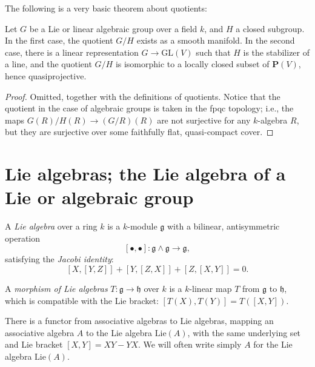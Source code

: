 The following is a very basic theorem about quotients:

\begin{theorem}
 \label{theorem-quotients}
Let $G$ be a Lie or linear algebraic group over a field $k$, and $H$ a closed subgroup. In the first case, the quotient $G/H$ exists as a smooth manifold. In the second case, there is a linear representation $G\to \text{GL}(V)$ such that $H$ is the stabilizer of a line, and the quotient $G/H$ is isomorphic to a locally closed subset of $\mathbf P(V)$, hence quasiprojective.
\end{theorem}

\begin{proof}
 Omitted, together with the definitions of quotients. Notice that the quotient in the case of algebraic groups is taken in the fpqc topology; i.e., the maps $G(R)/H(R)\to (G/R)(R)$ are not surjective for any $k$-algebra $R$, but they are surjective over some faithfully flat, quasi-compact cover. 
\end{proof}





\section{Lie algebras; the Lie algebra of a Lie or algebraic group}
\label{section-Liealgebras}

\begin{definition}
\label{definition-Liealgebra}
A {\it Lie algebra} over a ring $k$ is a $k$-module $\mathfrak g$ with a bilinear, antisymmetric operation 
$$[\bullet,\bullet]: \mathfrak g \wedge \mathfrak g \to \mathfrak g,$$ 
satisfying the {\it Jacobi identity}:
\begin{equation} 
\label{equation-Jacobiidentity}
[X,[Y,Z]] + [Y,[Z,X]] + [Z,[X,Y]] = 0. 
\end{equation}

A {\it morphism of Lie algebras} $T:\mathfrak g \to \mathfrak h$ over $k$ is a $k$-linear map $T$ from $\mathfrak g$ to $\mathfrak h$, which is compatible with the Lie bracket: $[T(X), T(Y)] = T([X,Y])$.
\end{definition}

There is a functor from associative algebras to Lie algebras, mapping an associative algebra $A$ to the Lie algebra $\text{Lie}(A)$, with the same underlying set and Lie bracket $[X,Y]=XY-YX$. We will often write simply $A$ for the Lie algebra $\text{Lie}(A)$.

